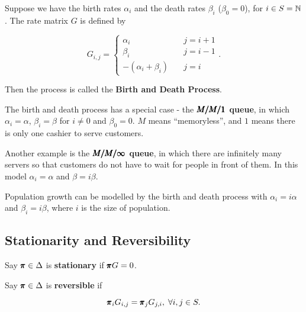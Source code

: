 \begin{example}
    Suppose we have the birth rates $\alpha_i$ and the death rates $\beta_i$ ($\beta_0 = 0$), for $i \in S = \mathbb{N}$. The rate matrix $G$ is defined by 

    \begin{equation*}
        G_{i,j} = 
        \begin{cases}
            \alpha_i \quad & j = i+1 \\ 
            \beta_i \quad & j = i-1 \\ 
            - (\alpha_i + \beta_i) \quad & j = i
        \end{cases}.
    \end{equation*}

    Then the process is called the \textbf{Birth and Death Process}.  
\end{example}

\begin{example}[$M/M/1$ queue]
    The birth and death process has a special case - the \textbf{$\pmb{M/M/1}$ queue}, in which $\alpha_i = \alpha$, $\beta_i = \beta$ for $i \neq 0$ and $\beta_0 = 0$. $M$ means ``memoryless'', and $1$ means there is only one cashier to serve customers.
\end{example}

\begin{example}
    Another example is the \textbf{$\pmb{M/M/\infty}$ queue}, in which there are infinitely many servers so that customers do not have to wait for people in front of them. In this model $\alpha_i = \alpha$ and $\beta = i \beta$.
\end{example}

\begin{example}
    Population growth can be modelled by the birth and death process with $\alpha_i = i \alpha$ and $\beta_i = i\beta$, where $i$ is the size of population.
\end{example}

\subsection{Stationarity and Reversibility}

\begin{definition}[Stationarity]
    Say $\pmb{\pi} \in \Delta$ is \textbf{stationary} if $\pmb{\pi} G = 0$.
\end{definition}

\begin{definition}[Reversibility]
    Say $\pmb{\pi} \in \Delta$ is \textbf{reversible} if 

    \begin{equation*}
        \pmb{\pi}_i G_{i,j} = \pmb{\pi}_j G_{j, i}, \; \forall i,j \in S.
    \end{equation*}
\end{definition}


